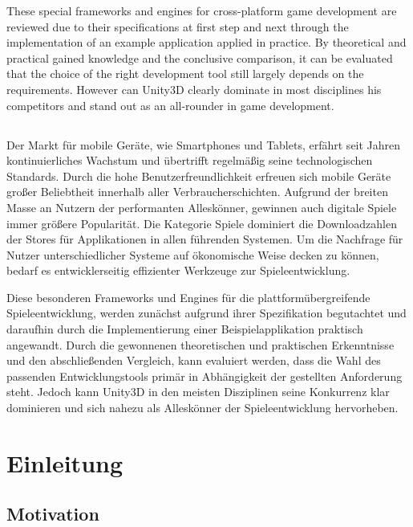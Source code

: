 \bigskip
These special frameworks and engines for cross-platform game development are reviewed due to their specifications at first step and next through the implementation of an example application applied in practice. By theoretical and practical gained knowledge and the conclusive comparison, it can be evaluated that the choice of the right development tool still largely depends on the requirements. However can Unity3D clearly dominate in most disciplines his competitors and stand out as an all-rounder in game development.


\section*{\centering\abstractname}
Der Markt für mobile Geräte, wie Smartphones und Tablets, erfährt seit Jahren kontinuierliches Wachstum und übertrifft regelmäßig seine technologischen Standards. Durch die hohe Benutzerfreundlichkeit erfreuen sich mobile Geräte großer Beliebtheit innerhalb aller Verbraucherschichten. Aufgrund der breiten Masse an Nutzern der performanten Alleskönner, gewinnen auch digitale Spiele immer größere Popularität. Die Kategorie Spiele dominiert die Downloadzahlen der Stores für Applikationen in allen führenden Systemen. Um die Nachfrage für Nutzer unterschiedlicher Systeme auf ökonomische Weise decken zu können, bedarf es entwicklerseitig effizienter Werkzeuge zur Spieleentwicklung.

\bigskip
Diese besonderen Frameworks und Engines für die plattformübergreifende Spieleentwicklung, werden zunächst aufgrund ihrer Spezifikation begutachtet und daraufhin durch die Implementierung einer Beispielapplikation praktisch angewandt. Durch die gewonnenen theoretischen und praktischen Erkenntnisse und den abschließenden Vergleich, kann evaluiert werden, dass die Wahl des passenden Entwicklungstools primär in Abhängigkeit der gestellten Anforderung steht. Jedoch kann Unity3D in den meisten Disziplinen seine Konkurrenz klar dominieren und sich nahezu als Alleskönner der Spieleentwicklung hervorheben.



\chapter{Einleitung}

\section{Motivation}
